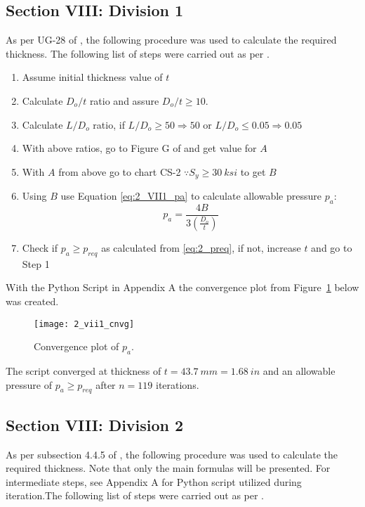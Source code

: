 \subsection{Section VIII: Division 1}
As per UG-28 of \citep{ASMEbvpcVII1}, the following procedure was used to calculate the required thickness.
The following list of steps were carried out as per \citep{ASMEbvpcVII1}.

\begin{enumerate}
	\item Assume initial thickness value of $t$
	\item Calculate $D_o/t$ ratio and assure $D_o/t \geq 10$.
	\item Calculate $L/D_o$ ratio, if $L/D_o \geq 50 \Rightarrow 50$ or  $L/D_o \leq 0.05 \Rightarrow 0.05$
	\item With above ratios, go to Figure G of \citep{ASMEbvpcIID} and get value for $A$
	\item With $A$ from above go to chart CS-2 $\because S_y \geq 30 \ ksi$ to get $B$
	\item Using $B$ use Equation \ref{eq:2_VII1_pa} to calculate allowable pressure $p_a$:
		\begin{equation}
			\label{eq:2_VII1_pa}
			p_a = \frac{4B}{3 \left(\frac{D_o}{t} \right)}
		\end{equation}
	\item Check if $p_a \geq p_{req}$ as calculated from \ref{eq:2_preq}, if not, increase $t$ and go to Step 1\\
	
\end{enumerate}

With the Python Script in Appendix A the convergence plot from Figure~\ref{fig:2_vii1_cnvg} below was created.
\begin{figure}[H]
    \centering
    \texttt{[image: 2\_vii1\_cnvg]}
    \caption{Convergence plot of $p_a$.}
    \label{fig:2_vii1_cnvg}
\end{figure}

The script converged at thickness of $t = 43.7\ mm = 1.68\ in$ and an allowable pressure of $p_a\geq p_{req}$ after $n=119$ iterations. 


\subsection{Section VIII: Division 2}
As per subsection 4.4.5 of \citep{ASMEbvpcVII2}, the following procedure was used to calculate the required thickness. Note that only the main formulas will be presented. For intermediate steps, see  Appendix A for Python script utilized during iteration.The following list of steps were carried out as per \citep{ASMEbvpcVII2}.

